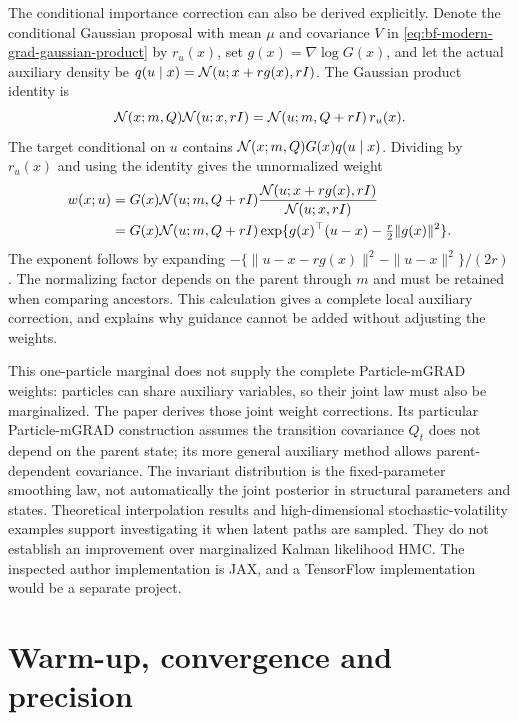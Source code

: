 The conditional importance correction can also be derived explicitly.
Denote the conditional Gaussian proposal with mean $\mu$ and covariance
$V$ in \eqref{eq:bf-modern-grad-gaussian-product} by $r_u(x)$, set
$g(x)=\nabla\log G(x)$, and let the actual auxiliary density be
$q(u\mid x)=\mathcal{N}(u;x+rg(x),rI)$. The Gaussian product identity is
\begin{equation}
 \mathcal{N}(x;m,Q)\mathcal{N}(u;x,rI)
    =\mathcal{N}(u;m,Q+rI)\,r_u(x).
 \label{eq:bf-modern-grad-product-density}
\end{equation}
The target conditional on $u$ contains
$\mathcal{N}(x;m,Q)G(x)q(u\mid x)$. Dividing by $r_u(x)$ and using the
identity gives the unnormalized weight
\begin{align}
 w(x;u)&=G(x)\mathcal{N}(u;m,Q+rI)
       \frac{\mathcal{N}(u;x+rg(x),rI)}{\mathcal{N}(u;x,rI)}\\
 &=G(x)\mathcal{N}(u;m,Q+rI)
       \exp\{g(x)^\top(u-x)-\tfrac r2\|g(x)\|^2\}.
 \label{eq:bf-modern-grad-conditional-weight}
\end{align}
The exponent follows by expanding
$-\{\|u-x-rg(x)\|^2-\|u-x\|^2\}/(2r)$.
The normalizing factor depends on the parent through $m$ and must be
retained when comparing ancestors. This calculation gives a complete
local auxiliary correction, and explains why guidance cannot be added
without adjusting the weights.

This one-particle marginal does not supply the complete Particle-mGRAD
weights: particles can share auxiliary variables, so their joint law must
also be marginalized. The paper derives those joint weight corrections. Its
particular Particle-mGRAD construction assumes the transition covariance
$Q_t$ does not depend on the parent state; its more general auxiliary method
allows parent-dependent covariance. The invariant distribution is the
fixed-parameter smoothing law, not automatically the joint posterior in
structural parameters and states. Theoretical interpolation results and
high-dimensional stochastic-volatility examples support investigating it
when latent paths are sampled. They do not establish an improvement over
marginalized Kalman likelihood HMC. The inspected author implementation is
JAX, and a TensorFlow implementation would be a separate project.

\section{Warm-up, convergence and precision}
\label{sec:bf-modern-diagnostics}

